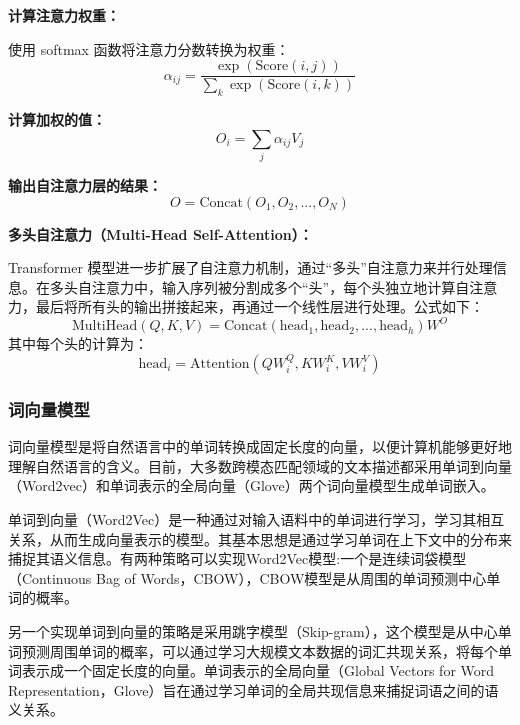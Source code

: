 \documentclass[a4paper]{zreport}
\begin{document}
\textbf{计算注意力权重：} 

使用 softmax 函数将注意力分数转换为权重：
\begin{equation}
	\alpha_{ij} = \frac{\exp(\text{Score}(i, j))}{\sum_{k}\exp(\text{Score}(i, k))}
\end{equation}

\textbf{计算加权的值：}
\begin{equation}
	O_i = \sum_{j} \alpha_{ij} V_j 
\end{equation}

\textbf{输出自注意力层的结果：}
\begin{equation}
	O = \text{Concat}(O_1, O_2, ..., O_N)
\end{equation}

\textbf{多头自注意力（Multi-Head Self-Attention）：}

Transformer 模型进一步扩展了自注意力机制，通过“多头”自注意力来并行处理信息。在多头自注意力中，输入序列被分割成多个“头”，每个头独立地计算自注意力，最后将所有头的输出拼接起来，再通过一个线性层进行处理。公式如下：
\begin{equation}
	\text{MultiHead}(Q, K, V) = \text{Concat}(\text{head}_1, \text{head}_2, ..., \text{head}_h)W^O
\end{equation}
其中每个头的计算为：
\begin{equation}
	\text{head}_i = \text{Attention}(QW_i^Q, KW_i^K, VW_i^V)
\end{equation}


\subsubsection{词向量模型}

词向量模型是将自然语言中的单词转换成固定长度的向量，以便计算机能够更好地理解自然语言的含义。目前，大多数跨模态匹配领域的文本描述都采用单词到向量（Word2vec）和单词表示的全局向量（Glove）两个词向量模型生成单词嵌入。

单词到向量（Word2Vec）是一种通过对输入语料中的单词进行学习，学习其相互关系，从而生成向量表示的模型。其基本思想是通过学习单词在上下文中的分布来捕捉其语义信息。有两种策略可以实现Word2Vec模型:一个是连续词袋模型（Continuous Bag of Words，CBOW），CBOW模型是从周围的单词预测中心单词的概率。

另一个实现单词到向量的策略是采用跳字模型（Skip-gram），这个模型是从中心单词预测周围单词的概率，可以通过学习大规模文本数据的词汇共现关系，将每个单词表示成一个固定长度的向量。单词表示的全局向量（Global Vectors for Word Representation，Glove）旨在通过学习单词的全局共现信息来捕捉词语之间的语义关系。
\end{document}
